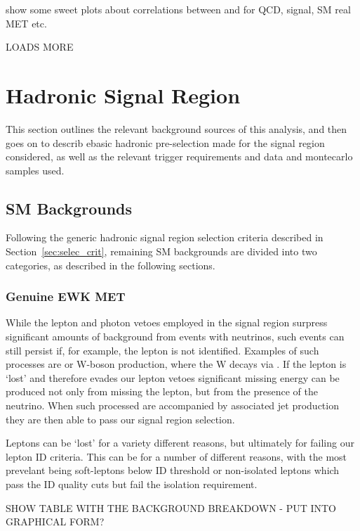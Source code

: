 show some sweet plots about correlations between \mht and \deltaHT for QCD, 
signal, SM real MET etc.

LOADS MORE


\section{Hadronic Signal Region}
\label{sec:selection_hadronic}

This section outlines the relevant background sources of this analysis, and
then goes on to describ ebasic hadronic pre-selection made for the signal 
region considered, as well as the relevant trigger requirements and data and 
montecarlo samples used.

\subsection{SM Backgrounds}
Following the generic hadronic signal region selection criteria described in 
Section~\ref{sec:selec_crit}, remaining SM backgrounds are divided into two 
categories, as described in the following sections.

\subsubsection{Genuine EWK MET}
While the lepton and photon vetoes employed in the signal region surpress 
significant amounts of background from events with neutrinos, such events can 
still persist if, for example, the lepton is not identified.
Examples of such processes are \ttbar or W-boson production, where the 
W decays via \wlnu. If the lepton is `lost' and therefore evades our 
lepton vetoes significant missing energy can be produced not only from missing 
the lepton, but from the presence of the neutrino. When such processed are accompanied 
by associated jet production they are then able to pass our signal region selection.

Leptons can be `lost' for a variety different reasons, but ultimately for failing
our lepton ID criteria. This can be for a number of different reasons, with the 
most prevelant being soft-leptons below ID threshold or non-isolated leptons 
which pass the ID quality cuts but fail the isolation requirement.

SHOW TABLE WITH THE BACKGROUND BREAKDOWN - PUT INTO GRAPHICAL FORM?

